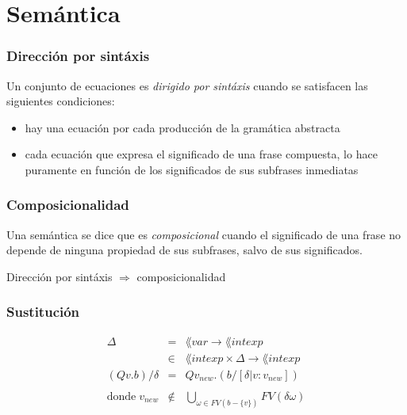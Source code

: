 \section{Semántica}
\subsubsection*{Dirección por sintáxis}
      \PN Un conjunto de ecuaciones es \textit{dirigido por sintáxis} cuando se satisfacen las siguientes condiciones:
      \begin{itemize}
        \item hay una ecuación por cada producción de la gramática abstracta
        \item cada ecuación que expresa el significado de una frase compuesta, lo hace puramente en función de los significados de sus subfrases inmediatas
      \end{itemize}
    
    \subsubsection*{Composicionalidad}
      \PN Una semántica se dice que es \textit{composicional} cuando el significado de una frase no depende de ninguna propiedad de sus subfrases, salvo de sus significados.

    \vspace{5mm}
    \PN Dirección por sintáxis $\Rightarrow$ composicionalidad
    
    \subsubsection*{Sustitución}
      \begin{eqnarray*}
        \Delta &=& \lang{var} \rightarrow \lang{intexp} \\
        &\in& \lang{intexp} \times \Delta \rightarrow \lang{intexp} \\
        (Qv.b)/\delta &=& Qv_{new}.(b/[\delta|v:v_{new}]) \\ \\
        \text{donde} \; v_{new} &\notin& \bigcup_{\omega \in FV(b-\{v\})} FV(\delta \omega)
      \end{eqnarray*}
    
